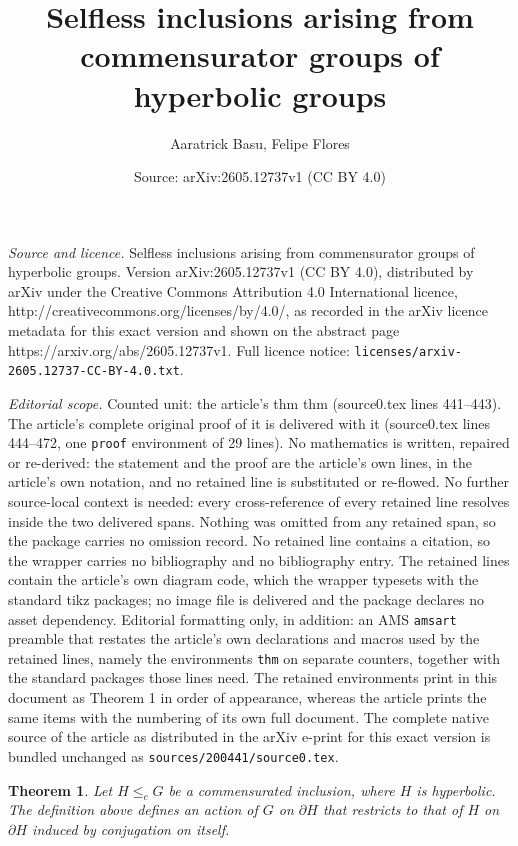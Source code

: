 \documentclass[10pt,a4paper]{amsart}
\title{Selfless inclusions arising from commensurator groups of hyperbolic groups}
\author{Aaratrick Basu, Felipe Flores}
\date{Source: arXiv:2605.12737v1 (CC BY 4.0)}
\newtheorem{thm}{Theorem}
\begin{document}
\maketitle

\noindent\emph{Source and licence.} Selfless inclusions arising from commensurator groups of hyperbolic groups. Version arXiv:2605.12737v1 (CC BY 4.0), distributed by arXiv under the Creative Commons Attribution 4.0 International licence, http://creativecommons.org/licenses/by/4.0/, as recorded in the arXiv licence metadata for this exact version and shown on the abstract page https://arxiv.org/abs/2605.12737v1. Full licence notice: \texttt{licenses/arxiv-2605.12737-CC-BY-4.0.txt}.\par\smallskip

\noindent\textit{Editorial scope.} Counted unit: the article's thm thm (source0.tex lines 441--443). The article's complete original proof of it is delivered with it (source0.tex lines 444--472, one \texttt{proof} environment of 29 lines). No mathematics is written, repaired or re-derived: the statement and the proof are the article's own lines, in the article's own notation, and no retained line is substituted or re-flowed.  No further source-local context is needed: every cross-reference of every retained line resolves inside the two delivered spans.  Nothing was omitted from any retained span, so the package carries no omission record.  No retained line contains a citation, so the wrapper carries no bibliography and no bibliography entry.  The retained lines contain the article's own diagram code, which the wrapper typesets with the standard tikz packages; no image file is delivered and the package declares no asset dependency.  Editorial formatting only, in addition: an AMS \texttt{amsart} preamble that restates the article's own declarations and macros used by the retained lines, namely the environments \texttt{thm} on separate counters, together with the standard packages those lines need.  The retained environments print in this document as Theorem 1 in order of appearance, whereas the article prints the same items with the numbering of its own full document.  The complete native source of the article as distributed in the arXiv e-print for this exact version is bundled unchanged as \texttt{sources/200441/source0.tex}.
\begin{thm}
   Let \( H \leq_c G \) be a commensurated inclusion, where \( H \) is hyperbolic. The definition above defines an action of \( G \) on \( \partial H \) that restricts to that of \( H \) on \( \partial H \) induced by conjugation on itself.
\end{thm}
\end{document}
